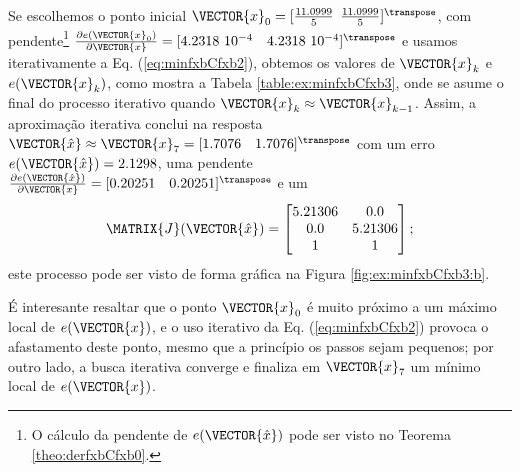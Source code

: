 \begin{SolutionT}
\label{ex:minfxbCfxb3:sol1}
Se escolhemos o ponto inicial $\VECTOR{x}_0=[\frac{11.0999}{5}$ $\frac{11.0999}{5}]^{\transpose}$,
com pendente\footnote{O cálculo da
pendente de $e(\VECTOR{\hat{x}})$ pode ser visto no Teorema \ref{theo:derfxbCfxb0}.} 
$\frac{\partial e(\VECTOR{x}_0)}{\partial \VECTOR{x} }=[4.2318~10^{-4}\quad 4.2318~10^{-4}]^{\transpose}$ e 
usamos iterativamente a Eq. (\ref{eq:minfxbCfxb2}), obtemos os valores 
de $\VECTOR{x}_k$ e $e(\VECTOR{x}_k)$, como mostra a Tabela \ref{table:ex:minfxbCfxb3},
onde se asume o final do processo iterativo quando $\VECTOR{x}_k \approx \VECTOR{x}_{k-1}$.
Assim, a aproximação iterativa conclui na resposta $\VECTOR{\hat{x}}\approx \VECTOR{x}_{7} =[1.7076\quad 1.7076]^{\transpose}$
com um erro $e(\VECTOR{\hat{x}})=2.1298$, uma pendente
$\frac{\partial e(\VECTOR{\hat{x}})}{\partial \VECTOR{x} }=[0.20251\quad 0.20251]^{\transpose}$
e um
\begin{equation}
\MATRIX{J}(\VECTOR{\hat{x}})=
\begin{bmatrix}
5.21306 & 0.0\\ 
0.0     & 5.21306\\
1       & 1
\end{bmatrix};
\end{equation}
este processo pode ser visto de forma gráfica na Figura \ref{fig:ex:minfxbCfxb3:b}.

É interesante resaltar que o ponto $\VECTOR{x}_0$ é muito próximo a um máximo local de 
$e(\VECTOR{x})$, e o uso iterativo da Eq. (\ref{eq:minfxbCfxb2}) 
provoca o afastamento deste ponto, mesmo que a princípio os passos sejam pequenos;
por outro lado, a busca iterativa converge e finaliza em $\VECTOR{x}_7$ um mínimo local 
de $e(\VECTOR{x})$.

\end{SolutionT}

